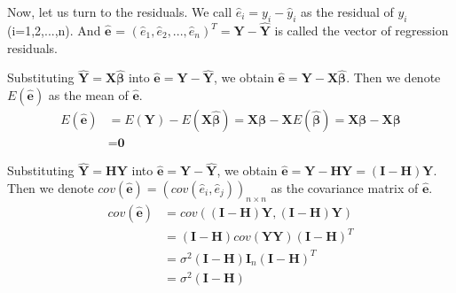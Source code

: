 \documentclass[a4paper]{article}
\begin{document}
\noindent
Now, let us turn to the residuals. We call $\hat{e}_i = y_i - \hat{y}_i$ as the residual of $y_i$ (i=1,2,...,n). And $\hat{\textbf{e}}$ = $(\hat{e}_1, \hat{e}_2, ..., \hat{e}_n)^T = \textbf{Y} - \hat{\textbf{Y}}$ is called the vector of regression residuals. 

\noindent
Substituting $\hat{\textbf{Y}} = \textbf{X} \hat{\bm{\beta}}$ into $\hat{\textbf{e}} =  \textbf{Y} - \hat{\textbf{Y}}$, we obtain $\hat{\textbf{e}} = \textbf{Y} - \textbf{X} \hat{\bm{\beta}}$. Then we denote $E(\hat{\textbf{e}})$ as the mean of $\hat{\textbf{e}}$.
\begin{equation*}
\begin{aligned}
   E(\hat{\textbf{e}}) & = E(\textbf{Y}) - E(\textbf{X} \hat{\bm{\beta}}) = \textbf{X} \bm{\beta} - \textbf{X} E(\hat{\bm{\beta}}) = \textbf{X} \bm{\beta} - \textbf{X} \bm{\beta} \\
   & = \textbf{0}
\end{aligned}
\end{equation*}

\noindent
Substituting $\hat{\textbf{Y}} = \textbf{H} \textbf{Y}$ into $\hat{\textbf{e}} =  \textbf{Y} - \hat{\textbf{Y}}$, we obtain $\hat{\textbf{e}} = \textbf{Y} - \textbf{HY} = (\textbf{I} - \textbf{H}) \textbf{Y}$. Then we denote $cov(\hat{\textbf{e}}) = (cov(\hat{e}_i, \hat{e}_j))_{n \times n}$ as the covariance matrix of $\hat{\textbf{e}}$.
\begin{equation*}
\begin{aligned}
cov(\hat{\textbf{e}}) & = cov((\textbf{I} - \textbf{H}) \textbf{Y}, (\textbf{I} - \textbf{H}) \textbf{Y}) \\ 
& = (\textbf{I}-\textbf{H})cov(\textbf{Y} \textbf{Y})(\textbf{I}-\textbf{H})^T \\
& = \sigma^2 (\textbf{I}-\textbf{H}) \textbf{I}_n (\textbf{I}-\textbf{H})^T \\
& = \sigma^2 (\textbf{I}-\textbf{H})
\end{aligned}
\end{equation*}
\end{document}

